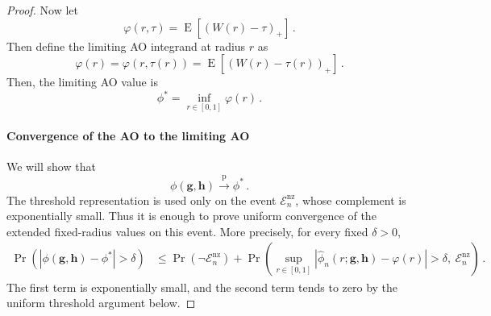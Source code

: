 \documentclass{article}
\DeclareMathOperator{\expect}{E}
\theoremstyle{definition}
\newcommand*{\bb}{\boldsymbol}
\def\bh{\bb{h}}
\def\bg{\bb{g}}
\begin{document}
\begin{bibunit}
\begin{proof}
Now let
$$
\varphi(r, \tau) = \expect \left[ (W(r)-\tau)_{+} \right] \,.
$$
Then define the limiting AO integrand at radius $r$ as
$$
    \varphi(r) = \varphi(r, \tau(r)) = \expect\left[(W(r) - \tau(r))_{+}\right] \,.
$$
Then, the limiting AO value is
$$
    \phi^* = \underset{r \in [0,1]}{\inf} \varphi(r) \,.
$$



\paragraph*{Convergence of the AO to the limiting AO}

	We will show that
	\begin{equation}
	\label{eq:ao_conv}
	    \phi(\bg,\bh)\overset{\mathrm p}{\longrightarrow} \phi^* \,.
	\end{equation}
	The threshold representation is used only on the event
	$\mathcal E_n^{\mathrm{nz}}$, whose complement is exponentially small.
	Thus it is enough to prove uniform convergence of the extended fixed-radius
	values on this event. More precisely, for every fixed $\delta>0$,
	$$
	\begin{aligned}
	\Pr\left(
	\left|\phi(\bg,\bh)-\phi^*\right|>\delta
	\right)
	&\leq
	\Pr\left(\lnot\mathcal E_n^{\mathrm{nz}}\right) +
	\Pr\left(
	\underset{r\in[0,1]}{\sup}
	\left|
	\widehat\phi_n(r;\bg,\bh)-\varphi(r)
	\right|>\delta,\ 
	\mathcal E_n^{\mathrm{nz}}
	\right) \,. 
	\end{aligned}
	$$
	The first term is exponentially small, and the second term tends to zero by
	the uniform threshold argument below.
	

\end{proof}
\end{bibunit}
\end{document}
